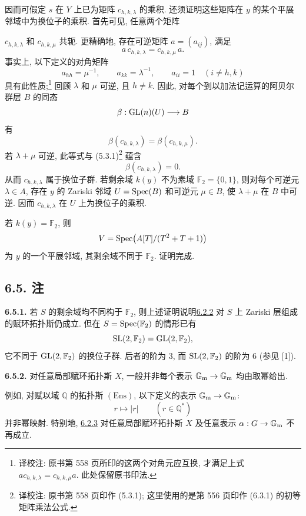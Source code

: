 因而可假定 $s$ 在 $Y$ 上已为矩阵 $c_{h,k,\lambda}$ 的乘积. 还须证明这些矩阵在 $y$ 的某个平展邻域中为换位子的乘积. 首先可见, 任意两个矩阵

$c_{h,k,\lambda}$ 和 $c_{h,k,\mu}$ 共轭. 更精确地, 存在可逆矩阵 $a=(a_{ij})$, 满足
%
\[
a\,c_{h,k,\lambda}=c_{h,k,\mu}\,a.
\]
事实上, 以下定义的对角矩阵
\[
a_{hh}=\mu^{-1},\qquad a_{kk}=\lambda^{-1},\qquad
a_{ii}=1\quad(i\ne h,k)
\]
具有此性质;\footnote{译校注: 原书第 558 页所印的这两个对角元应互换, 才满足上式 $a c_{h,k,\lambda}=c_{h,k,\mu}a$. 此处保留原书印法.} 回顾 $\lambda$ 和 $\mu$ 可逆, 且 $h\ne k$. 因此, 对每个到以加法记运算的阿贝尔群层 $B$ 的同态
%
\[
\beta:\operatorname{GL}(n)(U)\longrightarrow B
\]
有
\[
\beta(c_{h,k,\lambda})=\beta(c_{h,k,\mu}).
\]
若 $\lambda+\mu$ 可逆, 此等式与 (5.3.1)\footnote{译校注: 原书第 558 页印作 (5.3.1); 这里使用的是第 556 页印作 (6.3.1) 的初等矩阵乘法公式.} 蕴含
\[
\beta(c_{h,k,\lambda})=0.
\]
从而 $c_{h,k,\lambda}$ 属于换位子群. 若剩余域 $k(y)$ 不为素域 $\mathbb F_2=\{0,1\}$, 则对每个可逆元 $\lambda\in A$, 存在 $y$ 的 Zariski 邻域 $U=\operatorname{Spec}(B)$ 和可逆元 $\mu\in B$, 使 $\lambda+\mu$ 在 $B$ 中可逆. 因而 $c_{h,k,\lambda}$ 在 $U$ 上为换位子的乘积.
%
%
%
%
%

若 $k(y)=\mathbb F_2$, 则
\[
V=\operatorname{Spec}\bigl(A[T]/(T^2+T+1)\bigr)
\]
为 $y$ 的一个平展邻域, 其剩余域不同于 $\mathbb F_2$. 证明完成.
%

\subsection*{6.5. 注} \textbf{6.5.1.} 若 $S$ 的剩余域均不同构于 $\mathbb F_2$, 则上述证明说明\hyperlink{sga6.e10.prop.6-2-2}{6.2.2} 对 $S$ 上 Zariski 层组成的赋环拓扑斯仍成立. 但在 $S=\operatorname{Spec}(\mathbb F_2)$ 的情形已有
%
%
%
%
\[
\operatorname{SL}(2,\mathbb F_2)=\operatorname{GL}(2,\mathbb F_2),
\]
它不同于 $\operatorname{GL}(2,\mathbb F_2)$ 的换位子群. 后者的阶为 $3$, 而 $\operatorname{SL}(2,\mathbb F_2)$ 的阶为 $6$ (参见 [1]).
%
%

\textbf{6.5.2.} 对任意局部赋环拓扑斯 $X$, 一般并非每个表示 $\mathbb G_{\mathrm m}\to\mathbb G_{\mathrm m}$ 均由取幂给出.
%
%

例如, 对赋以域 $\mathbb Q$ 的拓扑斯 $(\mathrm{Ens})$, 以下定义的表示 $\mathbb G_{\mathrm m}\to\mathbb G_{\mathrm m}$:
%
\[
r\longmapsto |r|\qquad(r\in\mathbb Q^*)
\]
并非幂映射. 特别地, \hyperlink{sga6.e10.cor.6-2-3}{6.2.3} 对任意局部赋环拓扑斯 $X$ 及任意表示 $\alpha:G\to\mathbb G_{\mathrm m}$ 不再成立.
%
%

